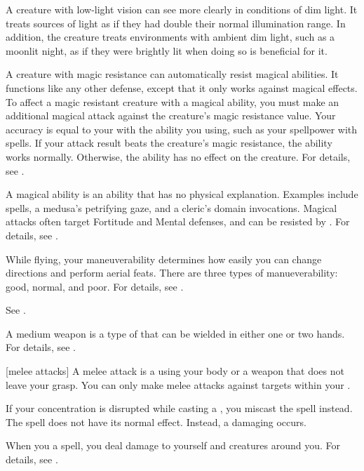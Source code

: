  A creature with low-light vision can see more clearly in conditions of dim light.
It treats sources of light as if they had double their normal illumination range.
In addition, the creature treats environments with ambient dim light, such as a moonlit night, as if they were brightly lit when doing so is beneficial for it.

 A creature with magic resistance can automatically resist magical abilities.
It functions like any other defense, except that it only works against magical effects.
To affect a magic resistant creature with a magical ability, you must make an additional magical attack against the creature's magic resistance value.
Your accuracy is equal to your  with the ability you using, such as your spellpower with spells.
If your attack result beats the creature's magic resistance, the ability works normally.
Otherwise, the ability has no effect on the creature.
For details, see .

 A magical ability is an ability that has no physical explanation.
Examples include spells, a medusa's petrifying gaze, and a cleric's domain invocations.
Magical attacks often target Fortitude and Mental defenses, and can be resisted by .
For details, see .

 While flying, your maneuverability determines how easily you can change directions and perform aerial feats.
There are three types of manueverability: good, normal, and poor.
For details, see .

 See .

 A medium weapon is a type of  that can be wielded in either one or two hands.
For details, see .

[melee attacks] A melee attack is a  using your body or a weapon that does not leave your grasp.
You can only make melee attacks against targets within your .

 If your concentration is disrupted while casting a , you miscast the spell instead.
The spell does not have its normal effect.
Instead, a damaging  occurs.

 When you  a spell, you deal damage to yourself and creatures around you.
For details, see .

